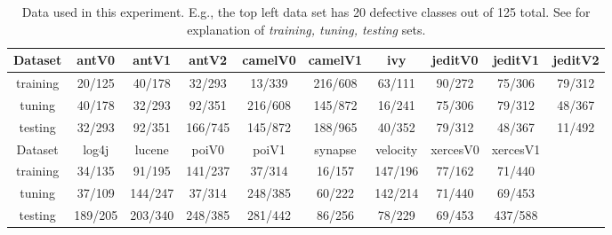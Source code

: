  \begin{table*}[t]

\renewcommand{\baselinestretch}{0.8}
\scriptsize
\centering
  \begin{tabular}{c c c c c c c c c c } \hline
  Dataset &antV0&antV1&antV2&camelV0&camelV1&ivy&jeditV0&jeditV1&jeditV2
\\\hline
  training &20/125 &40/178 &32/293 &13/339 &216/608 &63/111 &90/272 &75/306 &79/312
\\  tuning  &40/178 &32/293 &92/351 &216/608 &145/872 &16/241 &75/306 &79/312 &48/367
\\  testing &32/293 &92/351 &166/745 &145/872 &188/965 &40/352 &79/312 &48/367 &11/492
\\ \hline
  Dataset &log4j&lucene&poiV0&poiV1&synapse&velocity&xercesV0&xercesV1
\\\hline
  training &34/135 &91/195 &141/237 &37/314 &16/157 &147/196 &77/162 &71/440
\\  tuning  &37/109 &144/247 &37/314 &248/385 &60/222 &142/214 &71/440 &69/453
\\  testing &189/205 &203/340 &248/385 &281/442 &86/256 &78/229 &69/453 &437/588
\\  \end{tabular}

   \caption{Data used in this experiment. 
   E.g., the top left data set has 20 defective classes out of 125 total.
   See  for explanation of {\em training, tuning, testing} sets.
   }\label{tab:data1}
\end{table*} 


